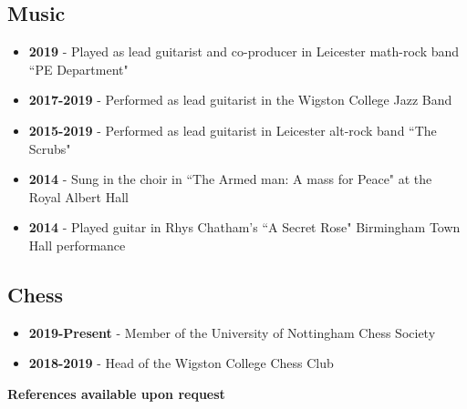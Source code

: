 \documentclass{article}
\begin{document}
\subsection{Music}
\begin{itemize}[noitemsep]

\item \textbf{2019} - Played as lead guitarist and co-producer in Leicester math-rock band ``PE Department"
\item \textbf{2017-2019} - Performed as lead guitarist in the Wigston College Jazz Band
\item \textbf{2015-2019} - Performed as lead guitarist in Leicester alt-rock band ``The Scrubs"
\item \textbf{2014} - Sung in the choir in ``The Armed man: A mass for Peace" at the Royal Albert Hall
\item \textbf{2014} - Played guitar in Rhys Chatham's ``A Secret Rose" Birmingham Town Hall performance

\end{itemize}

\subsection{Chess}
\begin{itemize}[noitemsep]

\item \textbf{2019-Present} - Member of the University of Nottingham Chess Society
\item \textbf{2018-2019} - Head of the Wigston College Chess Club

\end{itemize}










%
%
%
%


\begin{center}

\vskip 0.5cm
\textbf{References available upon request}

\end{center}
\end{document}
